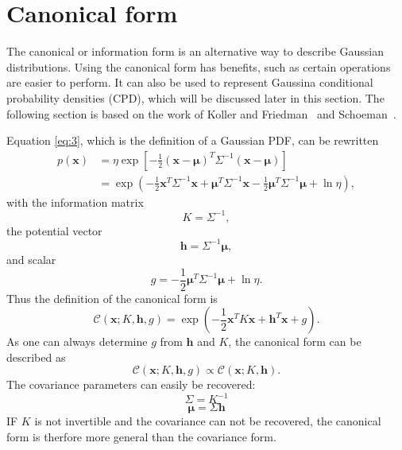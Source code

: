 \documentclass[12pt,oneside,openany,a4paper, %
afrikaans,english,
]{memoir}
\numberwithin{equation}{chapter}
\begin{document}
\section{Canonical form}
The canonical or information form is an alternative way to describe Gaussian distributions. Using the canonical form has benefits, such as certain operations are easier to perform. It can also be used to represent Gaussina conditional probability densities (CPD), which will be discussed later in this section. The following section is based on the work of Koller and Friedman~\cite{koller} and Schoeman~\citep{JC}.

Equation \ref{eq:3}, which is the definition of a Gaussian PDF, can be rewritten
\begin{equation}
\begin{split}\label{eq:6}
p(\bm{x}) & = \eta\exp\left[-\frac{1}{2}(\bm{x}-\bm{\mu})^T\Sigma^{-1}(\bm{x}-\bm{\mu})\right]\\
& = \exp\left(-\frac{1}{2}\bm{x}^T\Sigma^{-1}\bm{x} + \bm{\mu}^T\Sigma^{-1}\bm{x} - \frac{1}{2}\bm{\mu}^T\Sigma^{-1}\bm{\mu} + \ln{\eta}\right),
\end{split}
\end{equation}
with the information matrix
\begin{equation}\label{eq:7}
K = \Sigma^{-1},
\end{equation}
the potential vector
\begin{equation}\label{eq:8}
\bm{h} = \Sigma^{-1}\bm{\mu},
\end{equation}
and scalar
\begin{equation}\label{eq:9}
g = - \frac{1}{2}\bm{\mu}^T\Sigma^{-1}\bm{\mu} + \ln{\eta}.
\end{equation}
Thus the definition of the canonical form is
\begin{equation}\label{eq:canonical}
\mathcal{C}(\bm{x}; K,\bm{h},g) = \exp\left(-\frac{1}{2}\bm{x}^TK\bm{x} + \bm{h}^T\bm{x} +g \right).
\end{equation}
As one can always determine $g$ from $\bm{h}$ and $K$, the canonical form can be described as
\begin{equation}
\mathcal{C}(\bm{x}; K,\bm{h},g) \propto \mathcal{C}(\bm{x}; K,\bm{h}).
\end{equation}
The covariance parameters can easily be recovered:
\begin{equation}
\Sigma = K^{-1}
\end{equation}
\begin{equation}
\bm{\mu} = \Sigma\bm{h}
\end{equation}
IF $K$ is not invertible and the covariance can not be recovered, the canonical form is therfore more general than the covariance form.
\end{document}
